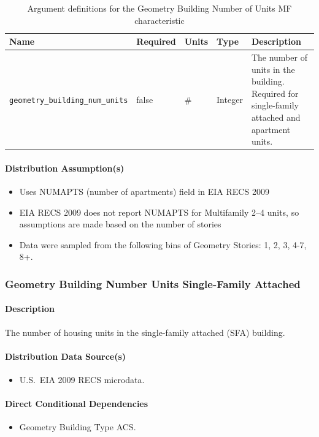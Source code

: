 \begin{longtable}[]{ |p{}|p{1.5cm}|p{1cm}|p{1.1cm}|p{6cm}| }
\caption{Argument definitions for the Geometry Building Number of Units MF characteristic} \label{table:hc_arg_def_geom_build_units_mf}  \\
\toprule\noalign{}
Name & Required & Units & Type & Description \\
\midrule\noalign{}
\endhead
\bottomrule\noalign{}
\endlastfoot
\texttt{geometry\_building\_num\_units} & false & \# & Integer & The
number of units in the building. Required for single-family attached and
apartment units. \\
\end{longtable}

\paragraph{Distribution Assumption(s)}
\begin{itemize}
    \item Uses NUMAPTS (number of apartments) field in EIA RECS 2009
    \item EIA RECS 2009 does not report NUMAPTS for Multifamily 2--4 units, so assumptions are made based on the number of stories
    \item Data were sampled from the following bins of Geometry Stories: 1, 2, 3, 4-7, 8+.
\end{itemize}

\subsubsection{Geometry Building Number Units Single-Family Attached}

\paragraph{Description}
The number of housing units in the single-family attached (SFA) building.

\paragraph{Distribution Data Source(s)}
\begin{itemize}
    \item U.S.~EIA 2009 RECS microdata.
\end{itemize}

\paragraph{Direct Conditional Dependencies}
\begin{itemize}
    \item Geometry Building Type ACS.
\end{itemize}

